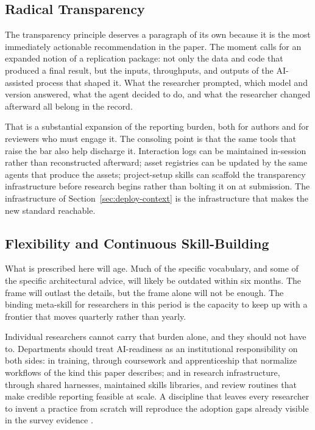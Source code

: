 \documentclass[11pt]{article}
\begin{document}
\subsection{Radical Transparency}
\label{sec:transparency}

The transparency principle deserves a paragraph of its own because it is the most immediately actionable recommendation in the paper. The moment calls for an expanded notion of a replication package: not only the data and code that produced a final result, but the inputs, throughputs, and outputs of the AI-assisted process that shaped it. What the researcher prompted, which model and version answered, what the agent decided to do, and what the researcher changed afterward all belong in the record.

That is a substantial expansion of the reporting burden, both for authors and for reviewers who must engage it. The consoling point is that the same tools that raise the bar also help discharge it. Interaction logs can be maintained in-session rather than reconstructed afterward; asset registries can be updated by the same agents that produce the assets; project-setup skills can scaffold the transparency infrastructure before research begins rather than bolting it on at submission. The infrastructure of Section~\ref{sec:deploy-context} is the infrastructure that makes the new standard reachable.

\subsection{Flexibility and Continuous Skill-Building}
\label{sec:flexibility}

What is prescribed here will age. Much of the specific vocabulary, and some of the specific architectural advice, will likely be outdated within six months. The frame will outlast the details, but the frame alone will not be enough. The binding meta-skill for researchers in this period is the capacity to keep up with a frontier that moves quarterly rather than yearly.

Individual researchers cannot carry that burden alone, and they should not have to. Departments should treat AI-readiness as an institutional responsibility on both sides: in training, through coursework and apprenticeship that normalize workflows of the kind this paper describes; and in research infrastructure, through shared harnesses, maintained skills libraries, and review routines that make credible reporting feasible at scale. A discipline that leaves every researcher to invent a practice from scratch will reproduce the adoption gaps already visible in the survey evidence \citep{wiley2025adoption, mohammadi2026reshaping}.
\end{document}
